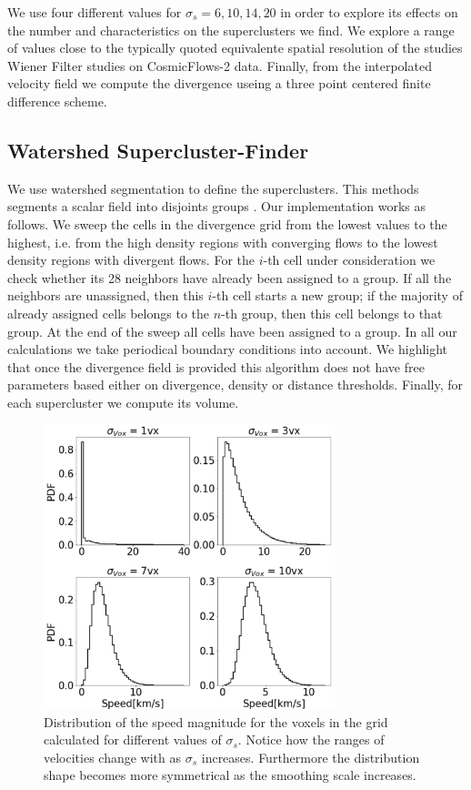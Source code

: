 \documentclass[usenatbib]{mnras}
\begin{document}
We use four different values for $\sigma_s=6, 10, 14, 20$ in order to explore its effects
on the number and characteristics on the superclusters we find.
We explore a range of values close to the typically quoted equivalente
spatial resolution of the studies Wiener Filter studies on
CosmicFlows-2 data.
Finally, from the interpolated velocity field we compute the
divergence useing a three point centered finite difference scheme.


\subsection{Watershed Supercluster-Finder}


We use watershed segmentation to define the superclusters.
This methods segments a scalar field into disjoints groups \citep{BeucherWatershed1979}.
Our implementation works as follows. 
We sweep the cells in the divergence grid from the lowest values to the highest, i.e. from
the high density regions with converging flows to the lowest density regions with divergent
flows.
For the $i$-th cell under consideration we check whether its 28 neighbors have already been assigned to a group. 
If all the neighbors are unassigned, then this $i$-th cell starts a
new group; if the majority of already assigned cells belongs to the
$n$-th group, then this cell belongs to that group.  
At the end of the sweep all cells have been assigned to a group. 
In all our calculations we take periodical boundary conditions into
account.  
We highlight that once the divergence field is provided this algorithm
does not have free parameters based either on divergence, density or distance thresholds. 
Finally, for each supercluster we compute its volume.


\begin{figure}
    \centering
    \includegraphics[width=240pt]{smooth_vel_dist.pdf}
    \caption{Distribution of the speed magnitude for the voxels in the
      grid calculated for different values of $\sigma_{s}$. 
      Notice how the ranges of velocities change with as $\sigma_{s}$
      increases.
    Furthermore the distribution shape becomes more symmetrical as the
    smoothing scale increases.}
    \label{fig:smooth_vel_dist}
\end{figure}
\end{document}
